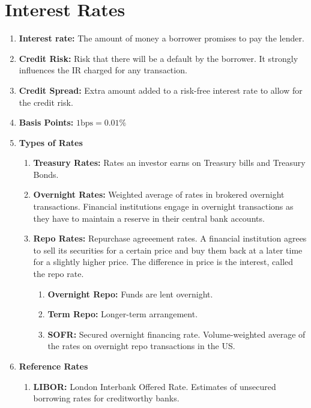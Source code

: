 
\section{Interest Rates}

\begin{enumerate}
    \item \textbf{Interest rate:} The amount of money a borrower promises to pay the lender.
    \item \textbf{Credit Risk:} Risk that there will be a default by the borrower. It strongly influences the IR charged for any transaction.
    \item \textbf{Credit Spread:} Extra amount added to a risk-free interest rate to allow for the credit risk.
    \item \textbf{Basis Points:} $1 \text{bps} = 0.01\%$
    \item \textbf{Types of Rates}
    \begin{enumerate}
        \item \textbf{Treasury Rates:} Rates an investor earns on Treasury bills and Treasury Bonds.
        \item \textbf{Overnight Rates:} Weighted average of rates in brokered overnight transactions. Financial institutions engage in overnight transactions as they have to maintain a reserve in their central bank accounts.
        \item \textbf{Repo Rates:} Repurchase agreeement rates. A financial institution agrees to sell its securities for a certain price and buy them back at a later time for a slightly higher price. The difference in price is the interest, called the repo rate.
        \begin{enumerate}
            \item \textbf{Overnight Repo:} Funds are lent overnight.
            \item \textbf{Term Repo:} Longer-term arrangement.
            \item \textbf{SOFR:} Secured overnight financing rate. Volume-weighted average of the rates on overnight repo transactions in the US.
        \end{enumerate} 
    \end{enumerate}
    \item \textbf{Reference Rates}
    \begin{enumerate}
        \item \textbf{LIBOR:} London Interbank Offered Rate. Estimates of unsecured borrowing rates for creditworthy banks.

\end{enumerate}
\end{enumerate}
